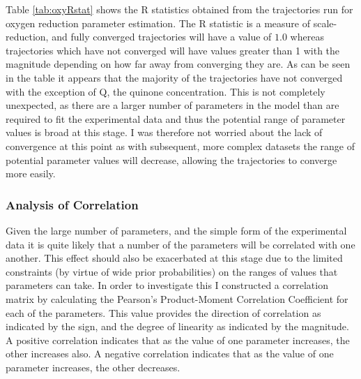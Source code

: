 Table \ref{tab:oxyRstat} shows the R statistics obtained from the trajectories run for oxygen reduction parameter estimation. The R statistic is a measure of scale-reduction, and fully converged trajectories will have a value of $1.0$ whereas trajectories which have not converged will have values greater than 1 with the magnitude depending on how far away from converging they are. As can be seen in the table it appears that the majority of the trajectories have not converged with the exception of Q, the quinone concentration. This is not completely unexpected, as there are a larger number of parameters in the model than are required to fit the experimental data and thus the potential range of parameter values is broad at this stage. I was therefore not worried about the lack of convergence at this point as with subsequent, more complex datasets the range of potential parameter values will decrease, allowing the trajectories to converge more easily.

\subsubsection{Analysis of Correlation}
Given the large number of parameters, and the simple form of the experimental data it is quite likely that a number of the parameters will be correlated with one another. This effect should also be exacerbated at this stage due to the limited constraints (by virtue of wide prior probabilities) on the ranges of values that parameters can take. In order to investigate this I constructed a correlation matrix by calculating the Pearson's Product-Moment Correlation Coefficient for each of the parameters. This value provides the direction of correlation as indicated by the sign, and the degree of linearity as indicated by the magnitude. A positive correlation indicates that as the value of one parameter increases, the other increases also. A negative correlation indicates that as the value of one parameter increases, the other decreases.

